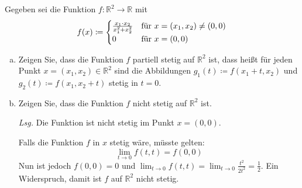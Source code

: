\documentclass{scrreprt}
\begin{document}
\newpage
Gegeben sei die Funktion $f \colon \mathbb{R}^2 \to \mathbb{R}$ mit
\[
  f(x) \coloneqq \begin{cases}
    \frac{x_1 \cdot x_2}{x_1^2 + x_2^2} & \text{für } x = \qty(x_1, x_2) \ne (0, 0) \\
    0 & \text{für } x = (0, 0)
  \end{cases}
\]
\begin{enumerate}[a)]
\item Zeigen Sie, dass die Funktion $f$ partiell stetig auf $\mathbb{R}^2$ ist,
  dass heißt für jeden Punkt $x = (x_1, x_2) \in \mathbb{R}^2$ sind die
  Abbildungen $g_1(t) \coloneqq f(x_1 + t, x_2)$ und
  $g_2(t) \coloneqq f(x_1, x_2 + t)$ stetig in $t = 0$.
\item Zeigen Sie, dass die Funktion $f$ nicht stetig auf $\mathbb{R}^2$ ist.

  \textit{Lsg.} Die Funktion ist nicht stetig im Punkt $x = (0, 0)$.

  Falls die Funktion $f$ in $x$ stetig wäre, müsste gelten:
  \[
    \lim_{t \to 0} f(t, t) = f(0, 0)
  \]
  Nun ist jedoch $f(0, 0) = 0$ und
  $\lim_{t \to 0} f(t, t) = \lim_{t \to 0} \frac{t^2}{2t^2} = \frac{1}{2}$.
  Ein Widerspruch, damit ist $f$ auf $\mathbb{R}^2$ nicht stetig.

\end{enumerate}
\end{document}
